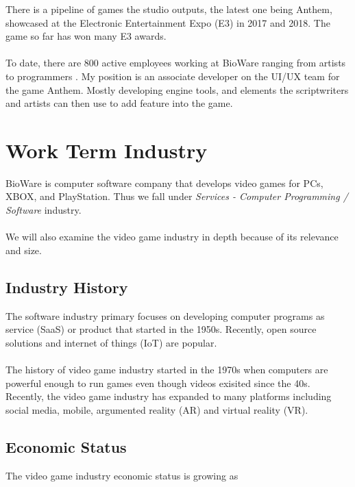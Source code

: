 \documentclass[10pt,letterpaper]{article}
\begin{document}
There is a pipeline of games the studio outputs, the latest one being Anthem, showcased at the Electronic Entertainment Expo (E3) in 2017 and 2018. The game so far has won many E3 awards.\\
\\
To date, there are 800 active employees working at BioWare ranging from artists to programmers \cite{bioware-wiki}. My position is an associate developer on the UI/UX team for the game Anthem. Mostly developing engine tools, and elements the scriptwriters and artists can then use to add feature into the game.\\

\clearpage
\section{Work Term Industry}\label{work-term-industry}

BioWare is computer software company that develops video games for PCs, XBOX, and PlayStation. Thus we fall under \textit{Services - Computer Programming / Software} industry.\\
\\
We will also examine the video game industry in depth because of its relevance and size. \\

\subsection{Industry History}

The software industry primary focuses on developing computer programs as service (SaaS) or product that started in the 1950s. Recently, open source solutions and internet of things (IoT) are popular.\cite{software-industry}\\
\\
The history of video game industry started in the 1970s when computers are powerful enough to run games even though videos exisited since the 40s. Recently, the video game industry has expanded to many platforms including social media, mobile, argumented reality (AR) and virtual reality (VR).\cite{video-game-industry-wiki, video-game-industry-stats}\\

\subsection{Economic Status}

The video game industry economic status is growing as
\end{document}
